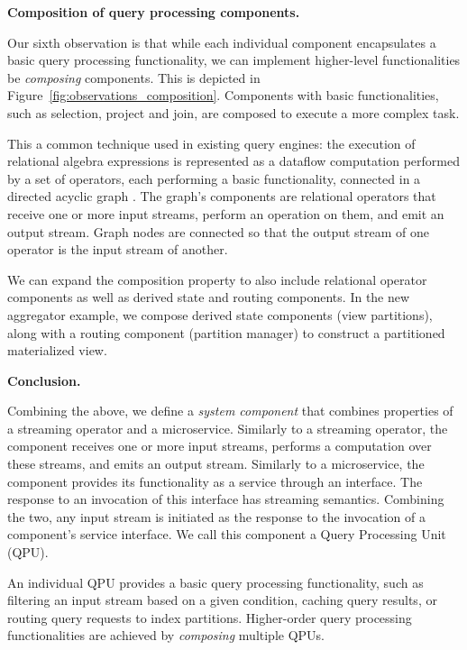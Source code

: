 \vspace{12pt}
\noindent
\textbf{Composition of query processing components.}

\noindent
Our sixth observation is that while each individual component encapsulates a basic query processing functionality,
we can implement higher-level functionalities be \textit{composing} components.
This is depicted in Figure~\ref{fig:observations_composition}.
Components with basic functionalities, such as selection, project and join, are composed to execute a more complex task.

This a common technique used in existing query engines:
the execution of relational algebra expressions is represented as a dataflow computation performed by
a set of operators, each performing a basic functionality, connected in a directed acyclic graph \cite{cockroachdb:distsql, gjengset:noria}.
The graph's components are relational operators that receive one or more input streams,
perform an operation on them, and emit an output stream.
Graph nodes are connected so that the output stream of one operator is the input stream of another.

We can expand the composition property to also include  relational operator components as well as
derived state and routing components.
In the new aggregator example, we compose derived state components (view partitions), along with a routing component
(partition manager) to construct a partitioned materialized view.

\vspace{12pt}
\noindent
\textbf{Conclusion.}

\noindent
Combining the above, we define a \textit{system component} that combines properties of a streaming operator and a microservice.
Similarly to a streaming operator, the component receives one or more input streams, performs a computation over these streams,
and emits an output stream.
Similarly to a microservice, the component provides its functionality as a service through an interface.
The response to an invocation of this interface has streaming semantics.
Combining the two, any input stream is initiated as the response to the invocation of a component's service interface.
We call this component a Query Processing Unit (QPU).

\medskip
\noindent
An individual QPU provides a basic query processing functionality,
such as filtering an input stream based on a given condition, caching query results,
or routing query requests to index partitions.
Higher-order query processing functionalities are achieved by \textit{composing} multiple QPUs.

